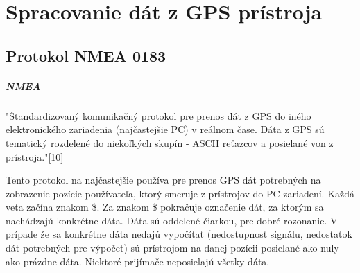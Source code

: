 
\chapter{Spracovanie dát z GPS prístroja}

\section{Protokol NMEA 0183}
\paragraph{NMEA}
"Štandardizovaný komunikačný protokol pre prenos dát z GPS do iného
elektronického zariadenia (najčastejšie PC) v reálnom čase. Dáta z GPS sú
tematický rozdelené do niekoľkých skupín - ASCII reťazcov a posielané von
z prístroja."[10]

Tento protokol na najčastejšie používa pre prenos GPS dát potrebných na zobrazenie pozície používateľa, ktorý smeruje z prístrojov do PC zariadení.
Každá veta začína znakom \$. Za znakom \$ pokračuje označenie dát, za ktorým sa nachádzajú konkrétne dáta. Dáta sú oddelené čiarkou, pre dobré rozonanie. V prípade že sa konkrétne dáta nedajú vypočítať (nedostupnosť signálu, nedostatok dát potrebných pre výpočet) sú prístrojom na danej pozícii posielané ako nuly ako prázdne dáta.  Niektoré prijímače neposielajú všetky dáta.

